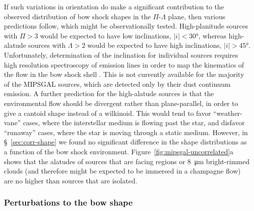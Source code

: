 \documentclass[useAMS, usenatbib, a4paper]{mnras}
\providecommand{\abs}[1]{\lvert#1\rvert}
\newcommand\hii{\ion{H}{ii}}
\begin{document}
If such variations in orientation do make a significant contribution
to the observed distribution of bow shock shapes in the
\(\Pi\)-\(\Lambda\) plane, then various predictions follow, which might be
observationally tested.  High-planitude sources with \(\Pi > 3\) would
be expected to have low inclinations, \(\abs{i} < \ang{30}\), whereas
high-alatude sources with \(\Lambda > 2\) would be expected to have high
inclinations, \(\abs{i} > \ang{45}\).  Unfortunately, determination of
the inclination for individual sources requires high resolution
spectroscopy of emission lines in order to map the kinematics of the
flow in the bow shock shell \citep[e.g.,][]{Henney:2013a}.  This is
not currently available for the majority of the MIPSGAL sources, which
are detected only by their dust continuum emission.  A further
prediction for the high-alatude sources is that the environmental flow
should be divergent rather than plane-parallel, in order to give a
cantoid shape instead of a wilkinoid.  This would tend to favor
``weather-vane'' cases, where the interstellar medium is flowing past
the star, and disfavor ``runaway'' cases, where the star is moving
through a static medium.  However, in \S~\ref{sec:corr-shape} we found
no significant difference in the shape distributions as a function of
the bow shock environment.  Figure~\ref{fig:mipsgal-uncorrelated}a
shows that the alatudes of sources that are facing \hii{} regions or
\SI{8}{\um} bright-rimmed clouds (and therefore might be expected to
be immersed in a champagne flow) are no higher than sources that are
isolated.

\subsubsection{Perturbations to the bow shape}
\label{sec:pert-bow-shape}
\end{document}
